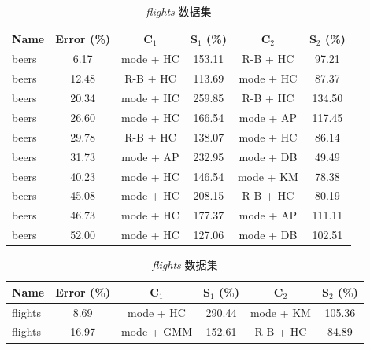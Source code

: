\documentclass[10pt]{article} %
\numberwithin{equation}{section}
\begin{document}
\begin{table}[htbp]
    \centering
    \small %
    \footnotesize %
    \setlength{\tabcolsep}{4pt} %
    \renewcommand{\arraystretch}{1.1} %
    \begin{subtable}{0.48\linewidth} %
        \centering
        \caption{\textit{beers} 数据集}
        \label{tab:beers_results}
        \begin{tabular}{lccccc}
            \toprule
            \textbf{Name} & \textbf{Error (\%)} & \textbf{C$_1$} & \textbf{S$_1$ (\%)} & \textbf{C$_2$} & \textbf{S$_2$ (\%)} \\
            \midrule
            beers & 6.17  & mode + HC  & 153.11 & R-B + HC  & 97.21 \\
            beers & 12.48 & R-B + HC   & 113.69 & mode + HC & 87.37 \\
            beers & 20.34 & mode + HC  & 259.85 & R-B + HC  & 134.50 \\
            beers & 26.60 & mode + HC  & 166.54 & mode + AP & 117.45 \\
            beers & 29.78 & R-B + HC   & 138.07 & mode + HC & 86.14 \\
            beers & 31.73 & mode + AP  & 232.95 & mode + DB & 49.49 \\
            beers & 40.23 & mode + HC  & 146.54 & mode + KM & 78.38 \\
            beers & 45.08 & mode + HC  & 208.15 & R-B + HC  & 80.19 \\
            beers & 46.73 & mode + HC  & 177.37 & mode + AP & 111.11 \\
            beers & 52.00 & mode + HC  & 127.06 & mode + DB & 102.51 \\
            \bottomrule
        \end{tabular}
    \end{subtable}
    \hfill
    \begin{subtable}{0.48\linewidth} %
        \centering
        \caption{\textit{flights} 数据集}
        \label{tab:flights_results}
        \begin{tabular}{lccccc}
            \toprule
            \textbf{Name} & \textbf{Error (\%)} & \textbf{C$_1$} & \textbf{S$_1$ (\%)} & \textbf{C$_2$} & \textbf{S$_2$ (\%)} \\
            \midrule
            flights & 8.69  & mode + HC  & 290.44 & mode + KM  & 105.36 \\
            flights & 16.97 & mode + GMM & 152.61 & R-B + HC   & 84.89 \\

\end{tabular}
\end{subtable}
\end{table}
\end{document}
